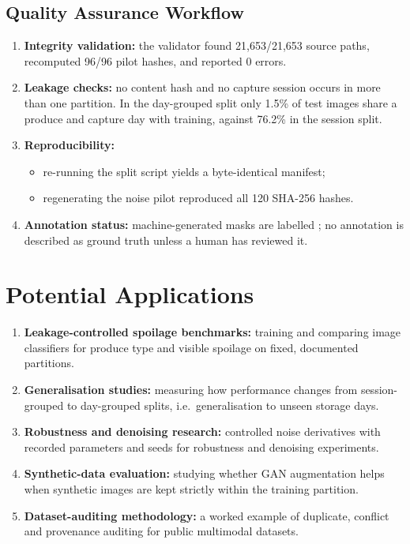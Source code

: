 \documentclass[journal]{IEEEtran}
\begin{document}
\subsection{Quality Assurance Workflow}
\begin{enumerate}
  \item \textbf{Integrity validation:} the validator found 21,653/21,653 source paths, recomputed 96/96 pilot hashes, and reported 0 errors.
  \item \textbf{Leakage checks:} no content hash and no capture session occurs in more than one partition. In the day-grouped split only 1.5\% of test images share a produce and capture day with training, against 76.2\% in the session split.
  \item \textbf{Reproducibility:}
  \begin{itemize}
    \item re-running the split script yields a byte-identical manifest;
    \item regenerating the noise pilot reproduced all 120 SHA-256 hashes.
  \end{itemize}
  \item \textbf{Annotation status:} machine-generated masks are labelled ; no annotation is described as ground truth unless a human has reviewed it.
\end{enumerate}

\section{Potential Applications}
\begin{enumerate}
  \item \textbf{Leakage-controlled spoilage benchmarks:} training and comparing image classifiers for produce type and visible spoilage on fixed, documented partitions.
  \item \textbf{Generalisation studies:} measuring how performance changes from session-grouped to day-grouped splits, i.e.\ generalisation to unseen storage days.
  \item \textbf{Robustness and denoising research:} controlled noise derivatives with recorded parameters and seeds for robustness and denoising experiments.
  \item \textbf{Synthetic-data evaluation:} studying whether GAN augmentation helps when synthetic images are kept strictly within the training partition.
  \item \textbf{Dataset-auditing methodology:} a worked example of duplicate, conflict and provenance auditing for public multimodal datasets.
\end{enumerate}
\end{document}

